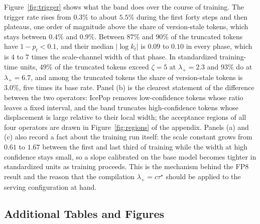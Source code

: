 Figure~\ref{fig:trigger} shows what the band does over the course of training. The trigger rate rises from $0.3\%$ to about $5.5\%$ during the first forty steps and then plateaus, one order of magnitude above the share of version-stale tokens, which stays between $0.4\%$ and $0.9\%$. Between $87\%$ and $90\%$ of the truncated tokens have $1-p_t<0.1$, and their median $|\log k_t|$ is $0.09$ to $0.10$ in every phase, which is $4$ to $7$ times the scale-channel width of that phase. In standardized training-time units, $49\%$ of the truncated tokens exceed $\zeta=5$ at $\lambda_+=2.3$ and $93\%$ do at $\lambda_+=6.7$, and among the truncated tokens the share of version-stale tokens is $3.0\%$, five times its base rate. Panel (b) is the clearest statement of the difference between the two operators: IcePop removes low-confidence tokens whose ratio leaves a fixed interval, and the band truncates high-confidence tokens whose displacement is large relative to their local width; the acceptance regions of all four operators are drawn in Figure~\ref{fig:regions} of the appendix. Panels (a) and (c) also record a fact about the training run itself: the scale constant grows from $0.61$ to $1.67$ between the first and last third of training while the width at high confidence stays small, so a slope calibrated on the base model becomes tighter in standardized units as training proceeds. This is the mechanism behind the FP8 result and the reason that the compilation $\lambda_+=c\tau^\star$ should be applied to the serving configuration at hand.

\subsection{Additional Tables and Figures}
\label{app:experimental-results}

